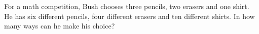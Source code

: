For a math competition, Bush chooses three pencils, two erasers and one shirt. He has six different pencils, four different erasers and ten different shirts. In how many ways can he make his choice?
